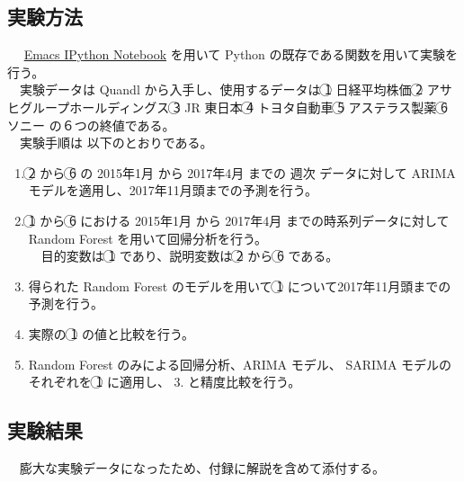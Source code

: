 \documentclass{scrartcl}
\begin{document}
\subsection{実験方法}
\label{sec:orgc221c42}
　 \href{https://github.com/millejoh/emacs-ipython-notebook}{Emacs IPython Notebook} を用いて Python の既存である関数を用いて実験を行う。\\
　実験データは Quandl から入手し、使用するデータは \textcircled{\scriptsize 1} 日経平均株価 \textcircled{\scriptsize 2} アサヒグループホールディングス \textcircled{\scriptsize 3} JR 東日本 \textcircled{\scriptsize 4} トヨタ自動車 \textcircled{\scriptsize 5} アステラス製薬 \textcircled{\scriptsize 6} ソニー の６つの終値である。\\
　実験手順は 以下のとおりである。\\
\newpage
\begin{enumerate}
\item \textcircled{\scriptsize 2} から \textcircled{\scriptsize 6} の 2015年1月 から 2017年4月 までの 週次 データに対して ARIMA モデルを適用し、2017年11月頭までの予測を行う。\\
\item \textcircled{\scriptsize 1} から \textcircled{\scriptsize 6} における 2015年1月 から 2017年4月 までの時系列データに対して Random Forest を用いて回帰分析を行う。\\
　目的変数は \textcircled{\scriptsize 1} であり、説明変数は \textcircled{\scriptsize 2} から \textcircled{\scriptsize 6} である。\\
\item 得られた Random Forest のモデルを用いて \textcircled{\scriptsize 1} について2017年11月頭までの予測を行う。\\
\item 実際の \textcircled{\scriptsize 1} の値と比較を行う。\\
\item Random Forest のみによる回帰分析、ARIMA モデル、 SARIMA モデルのそれぞれを \textcircled{\scriptsize 1} に適用し、 3. と精度比較を行う。\\
\end{enumerate}
\subsection{実験結果}
\label{sec:org8902258}
　膨大な実験データになったため、付録に解説を含めて添付する。\\
\end{document}
